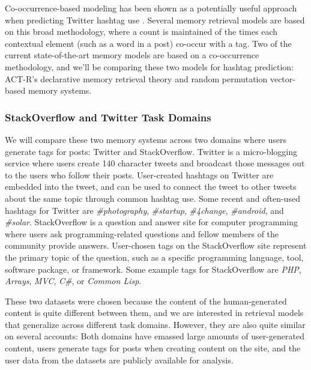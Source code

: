 \documentclass[man]{apa6}
\begin{document}
Co-occurrence-based modeling has been shown as a potentially useful approach when predicting Twitter hashtag use \parencite{Efron2010}.
Several memory retrieval models are based on this broad methodology, where a count is maintained of the times each contextual element (such as a word in a post) co-occur with a tag.
Two of the current state-of-the-art memory models are based on a co-occurrence methodology, and we'll be comparing these two models for hashtag prediction:
ACT-R's declarative memory retrieval theory and random permutation vector-based memory systems.

\subsubsection{StackOverflow and Twitter Task Domains}

We will compare these two memory systems across two domains where users generate tags for posts: Twitter and StackOverflow.
Twitter is a micro-blogging service where users create 140 character tweets and broadcast those messages out to the users who follow their posts.
User-created hashtags on Twitter are embedded into the tweet, and can be used to connect the tweet to other tweets about the same topic through common hashtag use.
Some recent and often-used hashtags for Twitter are \emph{\#photography}, \emph{\#startup}, \emph{\#4change}, \emph{\#android}, and \emph{\#solar}.
StackOverflow is a question and answer site for computer programming where users ask programming-related questions and fellow members of the community provide answers.
User-chosen tags on the StackOverflow site represent the primary topic of the question, such as a specific programming language, tool, software package, or framework.
Some example tags for StackOverflow are \emph{PHP}, \emph{Arrays}, \emph{MVC}, \emph{C\#}, or \emph{Common Lisp}.

These two datasets were chosen because the content of the human-generated content is quite different between them, and we are interested in retrieval models that generalize across different task domains.
However, they are also quite similar on several accounts:
Both domains have emassed large amounts of user-generated content, users generate tags for posts when creating content on the site, and the user data from the datasets are publicly available for analysis.
\end{document}
